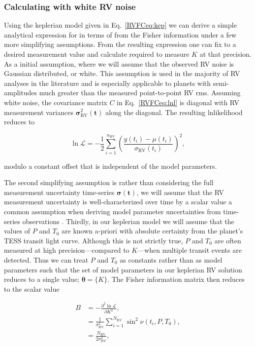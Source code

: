 \subsubsection{Calculating \sigK{} with white RV noise} \label{RVFCsect:fisherwhite}
Using the keplerian model given in Eq.~\ref{RVFCeq:kep} we can derive a simple analytical expression for
\sigK{} in terms of \nrv{} from the Fisher information under a few more simplifying assumptions. 
From the resulting expression one can fix \sigK{} to a desired measurement value and calculate \nrv{}
required to measure $K$ at that precision. As a initial assumption, where we will assume that the observed
RV noise is Gaussian distributed, or white.
This assumption is used in the majority of RV analyses in the literature and
is especially applicable to planets with semi-amplitudes much greater than the measured point-to-point RV rms.
Assuming white noise, the covariance matrix $C$ in Eq.~\ref{RVFCeq:lnl} is diagonal with RV measurement variances
$\boldsymbol{\sigma}_{\text{RV}}^2(\mathbf{t})$ along the diagonal. The resulting lnlikelihood reduces to

\begin{equation}
  \ln{\mathcal{L}} = -\frac{1}{2} \sum^{n_{\text{RV}}}_{i=1} \left( \frac{y(t_i)-\mu(t_i)}{\sigma_{\text{RV}}(t_i)} \right)^2,
  \label{RVFCeq:lnl2}
\end{equation}

\noindent modulo a constant offset that is independent of the model parameters.

The second simplifying assumption is rather
than considering the full measurement uncertainty time-series $\boldsymbol{\sigma}(\mathbf{t})$, we will
assume that the RV measurement uncertainty is well-characterized over time by a scalar value \sigRV{;} a common
assumption when deriving model parameter uncertainties from time-series observations \cite[e.g.][]{gaudi07, carter08}.
Thirdly, in our keplerian model 
we will assume that the values of $P$ and $T_0$ are known a-priori with absolute certainty
from the planet's TESS transit light curve. Although this is not strictly true, $P$ and $T_0$ are often
measured at high precision---compared to $K$---when multiple transit events are detected.
Thus we can treat $P$ and $T_0$ as constants rather than as model parameters such
that the set of model parameters in our keplerian RV solution reduces to a single value;
$\boldsymbol{\theta}=\{K\}$. The Fisher information matrix then reduces to the scalar value

\begin{align}
  B &= - \frac{\partial^2 \ln{\mathcal{L}}}{\partial K^2}, \\
  &= \frac{1}{\sigma_{\text{RV}}^2} \sum^{N_{\text{RV}}}_{i=1} \sin^2{\nu(t_i,P,T_0)},  \label{RVFCeq:fisher2} \\
  &= \frac{N_{\text{RV}}}{2\sigma^2_{\text{RV}}}, \label{RVFCeq:fisher3}
\end{align}  

